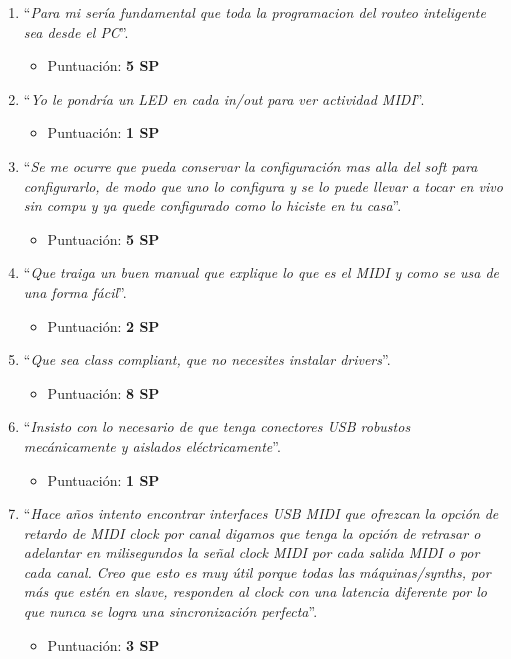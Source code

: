 \documentclass[
11pt, %
]{charter}
\begin{document}
\begin{enumerate}
	\item ``\emph{Para mi sería fundamental que toda la programacion del routeo inteligente sea desde el PC}''.
	\begin{itemize}
		\item Puntuación: \textbf{5 SP}
	\end{itemize}
	\item ``\emph{Yo le pondría un LED en cada in/out para ver actividad MIDI}''.
		\begin{itemize}
		\item Puntuación: \textbf{1 SP}
	\end{itemize}
	\item ``\emph{Se me ocurre que pueda conservar la configuración mas alla del soft para configurarlo, de modo que uno lo configura y se lo puede llevar a tocar en vivo sin compu y ya quede configurado como lo hiciste en tu casa}''.
	\begin{itemize}
		\item Puntuación: \textbf{5 SP}
	\end{itemize}
	
	\item ``\emph{Que traiga un buen manual que explique lo que es el MIDI y como se usa de una forma fácil}''.
	\begin{itemize}
		\item Puntuación: \textbf{2 SP}
	\end{itemize}
	\item ``\emph{Que sea class compliant, que no necesites instalar drivers}''.
	\begin{itemize}
		\item Puntuación: \textbf{8 SP}
	\end{itemize}
	\item ``\emph{Insisto con lo necesario de que tenga conectores USB robustos mecánicamente y aislados eléctricamente}''.
	\begin{itemize}
		\item Puntuación: \textbf{1 SP}
	\end{itemize}
	\item ``\emph{Hace años intento encontrar interfaces USB MIDI que ofrezcan la opción de retardo de MIDI clock por canal digamos que tenga la opción de retrasar o adelantar en milisegundos la señal clock MIDI por cada salida MIDI o por cada canal. Creo que esto es muy útil porque todas las máquinas/synths, por más que estén en slave, responden al clock con una latencia diferente por lo que nunca se logra una sincronización perfecta}''.
	\begin{itemize}
		\item Puntuación: \textbf{3 SP}
	\end{itemize}
\end{enumerate}
\end{document}
